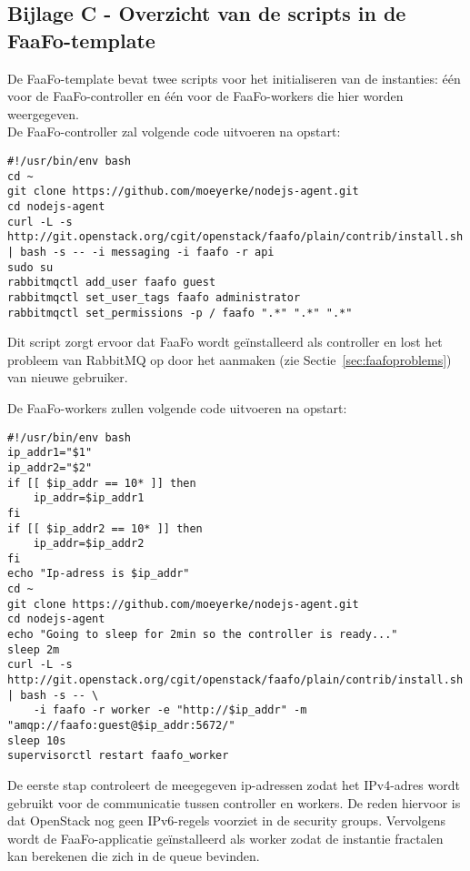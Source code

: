 \begin{appendices}
\section*{Bijlage C - Overzicht van de scripts in de FaaFo-template}
\label{att:scripts}

De FaaFo-template bevat twee scripts voor het initialiseren van de instanties: één voor de FaaFo-controller en één voor de FaaFo-workers die hier worden weergegeven.
\\
De FaaFo-controller zal volgende code uitvoeren na opstart:

\begin{code}
\begin{verbatim}
#!/usr/bin/env bash
cd ~
git clone https://github.com/moeyerke/nodejs-agent.git
cd nodejs-agent
curl -L -s http://git.openstack.org/cgit/openstack/faafo/plain/contrib/install.sh | bash -s -- -i messaging -i faafo -r api
sudo su
rabbitmqctl add_user faafo guest
rabbitmqctl set_user_tags faafo administrator
rabbitmqctl set_permissions -p / faafo ".*" ".*" ".*"
\end{verbatim}
\end{code}

Dit script zorgt ervoor dat FaaFo wordt geïnstalleerd als controller en lost het probleem van RabbitMQ op door het aanmaken (zie Sectie~\ref{sec:faafoproblems}) van nieuwe gebruiker.

De FaaFo-workers zullen volgende code uitvoeren na opstart:

\begin{code}
\begin{verbatim}
#!/usr/bin/env bash
ip_addr1="$1"
ip_addr2="$2"
if [[ $ip_addr == 10* ]] then
	ip_addr=$ip_addr1
fi
if [[ $ip_addr2 == 10* ]] then
	ip_addr=$ip_addr2
fi
echo "Ip-adress is $ip_addr"
cd ~
git clone https://github.com/moeyerke/nodejs-agent.git
cd nodejs-agent
echo "Going to sleep for 2min so the controller is ready..."
sleep 2m
curl -L -s http://git.openstack.org/cgit/openstack/faafo/plain/contrib/install.sh | bash -s -- \
	-i faafo -r worker -e "http://$ip_addr" -m "amqp://faafo:guest@$ip_addr:5672/"
sleep 10s
supervisorctl restart faafo_worker
\end{verbatim}
\end{code}

De eerste stap controleert de meegegeven ip-adressen zodat het IPv4-adres wordt gebruikt voor de communicatie tussen controller en workers. De reden hiervoor is dat OpenStack nog geen IPv6-regels voorziet in de security groups. Vervolgens wordt de FaaFo-applicatie geïnstalleerd als worker zodat de instantie fractalen kan berekenen die zich in de queue bevinden.

\end{appendices}